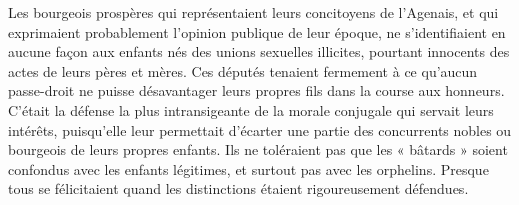  Les bourgeois prospères qui représentaient leurs concitoyens de l'Agenais, et qui exprimaient probablement l'opinion publique de leur époque, ne s'identifiaient en aucune façon aux enfants nés des unions sexuelles illicites, pourtant innocents des actes de leurs pères et mères. Ces députés tenaient fermement à ce qu'aucun passe-droit ne puisse désavantager leurs propres fils dans la course aux honneurs. C'était la défense la plus intransigeante de la morale conjugale qui servait leurs intérêts, puisqu'elle leur permettait d'écarter une partie des concurrents nobles ou bourgeois de leurs propres enfants. Ils ne toléraient pas que les « bâtards » soient confondus avec les enfants légitimes, et surtout pas avec les orphelins. Presque tous se félicitaient quand les distinctions étaient rigoureusement défendues.
 
 
 